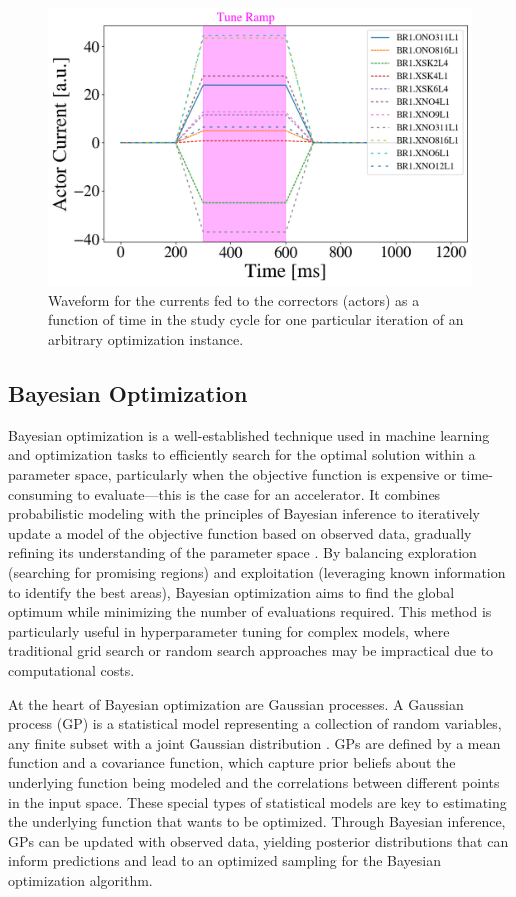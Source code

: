 \begin{figure}[H]
    \centering
    \includegraphics[width=\linewidth]{chapter5/actor_currents.png}
    \caption{Waveform for the currents fed to the correctors (actors) as a function of time in the study cycle for one particular iteration of an arbitrary optimization instance.}
    \label{fig:actorcurrents}
   \vspace{-1.25em}
\end{figure}

\subsection{Bayesian Optimization}

Bayesian optimization is a well-established technique used in machine learning and optimization tasks to efficiently search for the optimal solution within a parameter space, particularly when the objective function is expensive or time-consuming to evaluate---this is the case for an accelerator. It combines probabilistic modeling with the principles of Bayesian inference to iteratively update a model of the objective function based on observed data, gradually refining its understanding of the parameter space \cite{bayesian}. By balancing exploration (searching for promising regions) and exploitation (leveraging known information to identify the best areas), Bayesian optimization aims to find the global optimum while minimizing the number of evaluations required. This method is particularly useful in hyperparameter tuning for complex models, where traditional grid search or random search approaches may be impractical due to computational costs.

At the heart of Bayesian optimization are Gaussian processes. A Gaussian process (GP) is a statistical model representing a collection of random variables, any finite subset with a joint Gaussian distribution \cite{bayesian}. GPs are defined by a mean function and a covariance function, which capture prior beliefs about the underlying function being modeled and the correlations between different points in the input space. These special types of statistical models are key to estimating the underlying function that wants to be optimized. Through Bayesian inference, GPs can be updated with observed data, yielding posterior distributions that can inform predictions and lead to an optimized sampling for the Bayesian optimization algorithm. 

